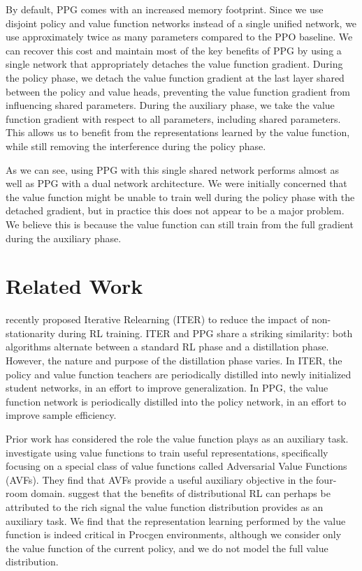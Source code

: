 \documentclass{article}
\begin{document}
By default, PPG comes with an increased memory footprint. Since we use disjoint policy and value function networks instead of a single unified network, we use approximately twice as many parameters compared to the PPO baseline. We can recover this cost and maintain most of the key benefits of PPG by using a single network that appropriately detaches the value function gradient. During the policy phase, we detach the value function gradient at the last layer shared between the policy and value heads, preventing the value function gradient from influencing shared parameters. During the auxiliary phase, we take the value function gradient with respect to all parameters, including shared parameters. This allows us to benefit from the representations learned by the value function, while still removing the interference during the policy phase.

As we can see, using PPG with this single shared network performs almost as well as PPG with a dual network architecture. We were initially concerned that the value function might be unable to train well during the policy phase with the detached gradient, but in practice this does not appear to be a major problem. We believe this is because the value function can still train from the full gradient during the auxiliary phase.

\section{Related Work}

\cite{igl2020impact} recently proposed Iterative Relearning (ITER) to reduce the impact of non-stationarity during RL training. ITER and PPG share a striking similarity: both algorithms alternate between a standard RL phase and a distillation phase. However, the nature and purpose of the distillation phase varies. In ITER, the policy and value function teachers are periodically distilled into newly initialized student networks, in an effort to improve generalization. In PPG, the value function network is periodically distilled into the policy network, in an effort to improve sample efficiency.

Prior work has considered the role the value function plays as an auxiliary task. \cite{bellemare2019geometric} investigate using value functions to train useful representations, specifically focusing on a special class of value functions called Adversarial Value Functions (AVFs). They find that AVFs provide a useful auxiliary objective in the four-room domain. \cite{lyle2019comparative} suggest that the benefits of distributional RL \citep{bellemare2017distributional} can perhaps be attributed to the rich signal the value function distribution provides as an auxiliary task. We find that the representation learning performed by the value function is indeed critical in Procgen environments, although we consider only the value function of the current policy, and we do not model the full value distribution.
\end{document}
